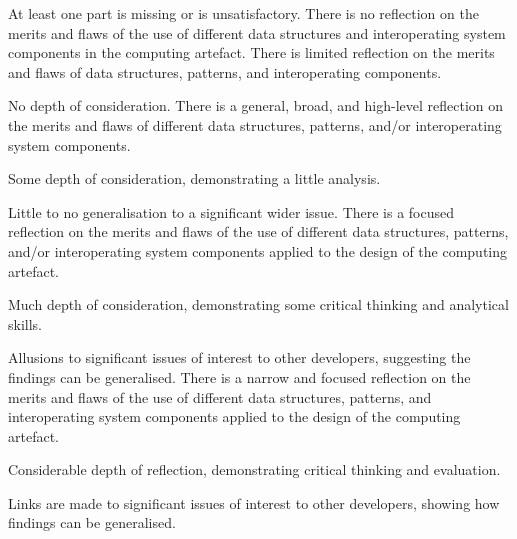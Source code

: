 \documentclass{../../fal_assignment}
\begin{document}
\rubricyeartwo
{}
\begin{markingrubric}
		\grade\fail At least one part is missing or is unsatisfactory.
%
	\grade\fail 	There is no reflection on the merits and flaws of the use of different data structures and interoperating system components in the computing artefact.
	\grade There is limited reflection on the merits and flaws of data structures, patterns, and interoperating components.
	\par No depth of consideration.
	\grade There is a general, broad, and high-level reflection on the merits and flaws of different data structures, patterns, and/or interoperating system components.
	\par Some depth of consideration, demonstrating a little analysis.
	\par Little to no generalisation to a significant wider issue. 
	\grade There is a focused reflection on the merits and flaws of the use of different data structures, patterns, and/or interoperating system components applied to the design of the computing artefact.
	\par Much depth of consideration, demonstrating some critical thinking and analytical skills.
	\par Allusions to significant issues of interest to other developers, suggesting the findings can be generalised. 
	\grade There is a narrow and focused reflection on the merits and flaws of the use of different data structures, patterns, and interoperating system components applied to the design of the computing artefact.
	\par Considerable depth of reflection, demonstrating critical thinking and evaluation.
	\par Links are made to significant issues of interest to other developers, showing how findings can be generalised. 

\end{markingrubric}
\end{document}
